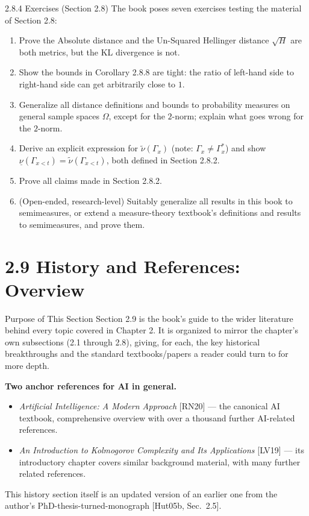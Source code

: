\documentclass[aspectratio=169,10pt]{beamer}
\begin{document}
\begin{frame}{2.8.4 Exercises (Section 2.8)}
  The book poses seven exercises testing the material of Section 2.8:
  \begin{enumerate}
    \item Prove the Absolute distance and the Un-Squared Hellinger distance
      $\sqrt{H}$ are both metrics, but the KL divergence is not.
    \item Show the bounds in Corollary 2.8.8 are tight: the ratio of
      left-hand side to right-hand side can get arbitrarily close to $1$.
    \item Generalize all distance definitions and bounds to probability
      measures on general sample spaces $\Omega$, except for the $2$-norm;
      explain what goes wrong for the $2$-norm.
    \item Derive an explicit expression for $\tilde\nu(\Gamma_x)$ (note:
      $\Gamma_x\ne\Gamma_x^*$) and show $\underline\nu(\Gamma_{x<t}) =
      \tilde\nu(\Gamma_{x<t})$, both defined in Section 2.8.2.
    \item Prove all claims made in Section 2.8.2.
    \item[6--7.] (Open-ended, research-level) Suitably generalize all
      results in this book to semimeasures, or extend a measure-theory
      textbook's definitions and results to semimeasures, and prove them.
  \end{enumerate}
\end{frame}

\section{2.9 History and References: Overview}

\begin{frame}{Purpose of This Section}
  Section 2.9 is the book's guide to the wider literature behind every topic
  covered in Chapter 2. It is organized to mirror the chapter's own
  subsections (2.1 through 2.8), giving, for each, the key historical
  breakthroughs and the standard textbooks/papers a reader could turn to for
  more depth.

  \textbf{Two anchor references for AI in general.}
  \begin{itemize}
    \item \emph{Artificial Intelligence: A Modern Approach} [RN20] --- the
      canonical AI textbook, comprehensive overview with over a thousand
      further AI-related references.
    \item \emph{An Introduction to Kolmogorov Complexity and Its
      Applications} [LV19] --- its introductory chapter covers similar
      background material, with many further related references.
  \end{itemize}
  This history section itself is an updated version of an earlier one from
  the author's PhD-thesis-turned-monograph [Hut05b, Sec.\ 2.5].
\end{frame}
\end{document}
